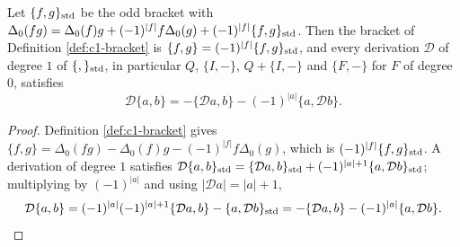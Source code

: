 \begin{lemma}
\label{lem:c12-deriv}
Let $\{f,g\}_{\rm std}$ be the odd bracket with $\Delta_0(fg)=\Delta_0(f)g+(-1)^{|f|}f\Delta_0(g)+(-1)^{|f|}\{f,g\}_{\rm std}$. Then the bracket of Definition \ref{def:c1-bracket} is $\{f,g\}=(-1)^{|f|}\{f,g\}_{\rm std}$, and every derivation $\mathcal D$ of degree $1$ of $\{,\}_{\rm std}$, in particular $Q$, $\{I,-\}$, $Q+\{I,-\}$ and $\{F,-\}$ for $F$ of degree $0$, satisfies
\begin{equation}
\mathcal D\{a,b\}=-\{\mathcal Da,b\}-(-1)^{|a|}\{a,\mathcal Db\}.
\label{eq:c12-deriv}
\end{equation}
\end{lemma}

\begin{proof}
Definition \ref{def:c1-bracket} gives $\{f,g\}=\Delta_0(fg)-\Delta_0(f)g-(-1)^{|f|}f\Delta_0(g)$, which is $(-1)^{|f|}\{f,g\}_{\rm std}$. A derivation of degree $1$ satisfies $\mathcal D\{a,b\}_{\rm std}=\{\mathcal Da,b\}_{\rm std}+(-1)^{|a|+1}\{a,\mathcal Db\}_{\rm std}$; multiplying by $(-1)^{|a|}$ and using $|\mathcal Da|=|a|+1$,
\[
\mathcal D\{a,b\}=(-1)^{|a|}(-1)^{|a|+1}\{\mathcal Da,b\}-\{a,\mathcal Db\}_{\rm std}=-\{\mathcal Da,b\}-(-1)^{|a|}\{a,\mathcal Db\}.
\]
\end{proof}

